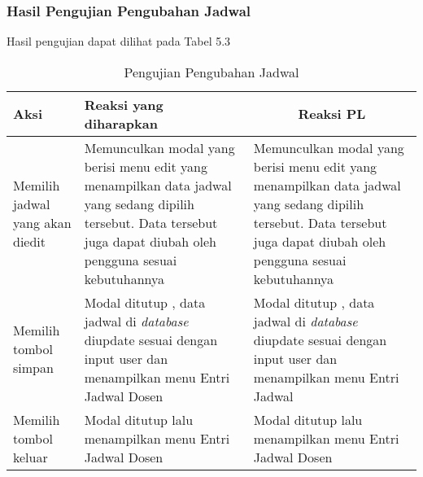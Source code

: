\subsubsection{Hasil Pengujian Pengubahan Jadwal}
Hasil pengujian dapat dilihat pada Tabel 5.3
\begin{center}
	\begin{table}[H]
		\caption{Pengujian Pengubahan Jadwal}
		\begin{tabular}{|p{5cm}|p{5cm}|p{5cm}|}
		\hline
		\centering Aksi	& 	\centering Reaksi yang diharapkan &  \multicolumn{1}{c|}{Reaksi PL} \\
		\hline
		Memilih jadwal yang akan diedit & Memunculkan modal yang berisi menu edit yang menampilkan data jadwal yang sedang dipilih tersebut. Data tersebut juga dapat diubah oleh pengguna sesuai kebutuhannya & Memunculkan modal yang berisi menu edit yang menampilkan data jadwal yang sedang dipilih tersebut. Data tersebut juga dapat diubah oleh pengguna sesuai kebutuhannya \\
		\hline
		Memilih tombol simpan & Modal ditutup , data jadwal di \textit{database} diupdate sesuai dengan input user dan menampilkan menu Entri Jadwal Dosen & Modal ditutup , data jadwal di \textit{database} diupdate sesuai dengan input user dan menampilkan menu Entri Jadwal \\
		\hline
		Memilih tombol keluar & Modal ditutup lalu menampilkan menu Entri Jadwal Dosen & Modal ditutup lalu menampilkan menu Entri Jadwal Dosen \\
		\hline
		\end{tabular}
	\end{table}
\end{center}

